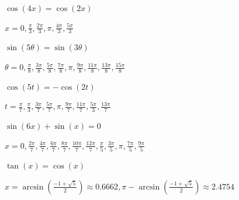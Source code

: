 \documentclass{ximera}
\begin{document}
\begin{question}
\begin{problem}
$\cos(4x) = \cos(2x)$

\begin{solution}
$x = 0, \frac{\pi}{3}, \frac{2\pi}{3}, \pi, \frac{4\pi}{3}, \frac{5\pi}{3}$
\end{solution}
\end{problem}

\begin{problem}
$\sin(5\theta) = \sin(3\theta)$

\begin{solution}
$\theta = 0, \frac{\pi}{8}, \frac{3\pi}{8}, \frac{5\pi}{8}, \frac{7\pi}{8}, \pi, \frac{9\pi}{8}, \frac{11\pi}{8}, \frac{13\pi}{8}, \frac{15\pi}{8}$
\end{solution}
\end{problem}

\begin{problem}
$\cos(5t) = -\cos(2t)$

\begin{solution}
$t = \frac{\pi}{7}, \frac{\pi}{3}, \frac{3\pi}{7}, \frac{5\pi}{7}, \pi, \frac{9\pi}{7}, \frac{11\pi}{7}, \frac{5\pi}{3}, \frac{13\pi}{7}$ 
\end{solution}
\end{problem}

\begin{problem}
$\sin(6x) + \sin(x) = 0$

\begin{solution}
$x = 0, \frac{2\pi}{7}, \frac{4\pi}{7}, \frac{6\pi}{7}, \frac{8\pi}{7}, \frac{10\pi}{7}, \frac{12\pi}{7}, \frac{\pi}{5}, \frac{3\pi}{5}, \pi, \frac{7\pi}{5}, \frac{9\pi}{5}$
\end{solution}
\end{problem}

\begin{problem} \label{solvemoreidentlast}
$\tan(x) = \cos(x)$ 

\begin{solution}
$x = \arcsin \left( \frac{-1 + \sqrt{5}}{2} \right) \approx 0.6662, \pi - \arcsin \left( \frac{-1 + \sqrt{5}}{2} \right) \approx 2.4754$
\end{solution}
\end{problem}

\end{question}
\end{document}
